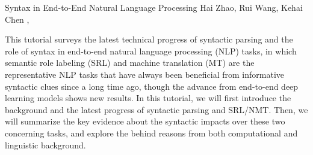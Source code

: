 \begin{tutorial}
  {Syntax in End-to-End Natural Language Processing}
  {Hai Zhao, Rui Wang, Kehai Chen}
  {\daydateyear, \tutorialmorningtime}


This tutorial surveys the latest technical progress of syntactic parsing and the role of syntax in end-to-end natural language processing (NLP) tasks, in which semantic role labeling (SRL) and machine translation (MT) are the representative NLP tasks that have always been beneficial from informative syntactic clues since a long time ago, though the advance from end-to-end deep learning models shows new results. In this tutorial, we will first introduce the background and the latest progress of syntactic parsing and SRL/NMT. Then, we will summarize the key evidence about the syntactic impacts over these two concerning tasks, and explore the behind reasons from both computational and linguistic background.

\end{tutorial}
